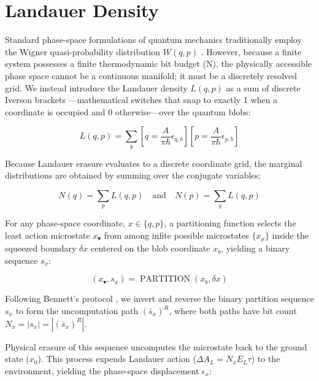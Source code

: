 \documentclass[%
  aps, reprint, prl, amsmath,amssymb
]{revtex4-2}
\begin{document}
\section{Landauer Density}


Standard phase-space formulations of quantum mechanics traditionally employ the Wigner quasi-probability distribution $W(q,p)$ \cite{Wigner1932}. However, because a finite system possesses a finite thermodynamic bit budget (N), the physically accessible phase space cannot be a continuous manifold; it must be a discretely resolved grid. We instead introduce the Landauer density $L(q,p)$ as a sum of discrete Iverson brackets \cite{Knuth1992}—mathematical switches that snap to exactly 1 when a coordinate is occupied and 0 otherwise—over the quantum blobs:

\begin{equation}
\label{eq:JointErasure}
L(q,p) = \sum_{b} \left[ q = \frac{A}{\pi \hbar} \epsilon_{q,b} \right] \left[ p = \frac{A}{\pi \hbar} \epsilon_{p,b} \right]
\end{equation}

Because Landauer erasure evaluates to a discrete coordinate grid, the marginal distributions are obtained by summing over the conjugate variables:


\begin{equation}
\label{eq:Marginals}
N(q) = \sum_{p} L(q,p)
\quad \text{and} \quad
N(p) = \sum_{q} L(q,p)
\end{equation}

For any phase-space coordinate, $x \in \{q, p\}$, a partitioning function selects the least action microstate $x_\blacktriangledown$ from among infite possible microstates $\{x_\mu\}$ inside the squeezed boundary $\delta x$ centered on the blob coordinate $x_b$, yielding a binary sequence $s_x$:

\begin{equation}
\label{eq:PartitionFunction}
(x_\blacktriangledown, s_x) = \operatorname{PARTITION}(x_b, \delta x)
\end{equation}

Following Bennett's protocol \cite{Bennett1973}, we invert and reverse the binary partition sequence $s_x$ to form the uncomputation path $(\bar{s}_x)^R$, where both paths have bit count $N_x = |s_x| = |(\bar{s}_x)^R|$.

Physical erasure of this sequence uncomputes the microstate back to the ground state ($x_0$). This process expends Landauer action ($\Delta A_L = N_x E_L \tau$) to the environment, yielding the phase-space displacement $\epsilon_x$:
\end{document}

